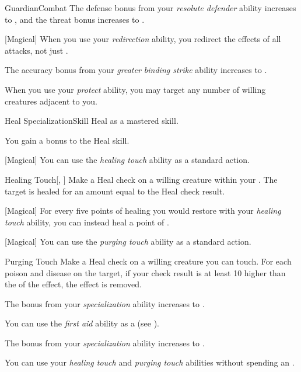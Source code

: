 \begin{feat}{Guardian}{Combat}
         The defense bonus from your \textit{resolute defender} ability increases to , and the threat bonus increases to .

        [Magical] When you use your \textit{redirection} ability, you redirect the effects of all attacks, not just .

         The accuracy bonus from your \textit{greater binding strike} ability increases to .

         When you use your \textit{protect} ability, you may target any number of willing creatures adjacent to you.
    \end{feat}

    \begin{feat}{Heal Specialization}{Skill}
        \featpre Heal as a mastered skill.

         You gain a  bonus to the Heal skill.

        [Magical] You can use the \textit{healing touch} ability as a standard action.
        \begin{apability}{Healing Touch}[, ]
            Make a Heal check on a willing creature within your .
            The target is healed for an amount equal to the Heal check result.
        \end{apability}

        [Magical] For every five points of healing you would restore with your \textit{healing touch} ability, you can instead heal a point of .

        [Magical] You can use the \textit{purging touch} ability as a standard action.
        \begin{apability}{Purging Touch}
            Make a Heal check on a willing creature you can touch.
            For each poison and disease on the target, if your check result is at least 10 higher than the  of the effect, the effect is removed.
        \end{apability}

         The bonus from your \textit{specialization} ability increases to .

         You can use the \textit{first aid} ability as a  (see ).

         The bonus from your \textit{specialization} ability increases to .

         You can use your \textit{healing touch} and \textit{purging touch} abilities without spending an .
    \end{feat}

